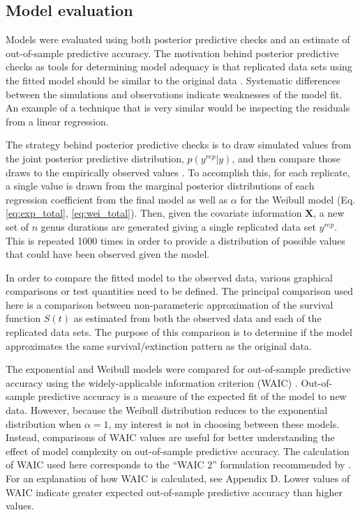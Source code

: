 \documentclass{article}
\begin{document}
\subsection{Model evaluation}

Models were evaluated using both posterior predictive checks and an estimate of out-of-sample predictive accuracy. The motivation behind posterior predictive checks as tools for determining model adequacy is that replicated data sets using the fitted model should be similar to the original data \citep{Gelman2013d}. Systematic differences between the simulations and observations indicate weaknesses of the model fit. An example of a technique that is very similar would be inspecting the residuals from a linear regression.

The strategy behind posterior predictive checks is to draw simulated values from the joint posterior predictive distribution, \(p(y^{rep} | y)\), and then compare those draws to the empirically observed values \citep{Gelman2013d}. To accomplish this, for each replicate, a single value is drawn from the marginal posterior distributions of each regression coefficient from the final model as well as \(\alpha\) for the Weibull model (Eq. \ref{eq:exp_total}, \ref{eq:wei_total}). Then, given the covariate information \(\mathbf{X}\), a new set of \(n\) genus durations are generated giving a single replicated data set \(y^{rep}\). This is repeated 1000 times in order to provide a distribution of possible values that could have been observed given the model. 

In order to compare the fitted model to the observed data, various graphical comparisons or test quantities need to be defined. The principal comparison used here is a comparison between non-parameteric approximation of the survival function \(S(t)\) as estimated from both the observed data and each of the replicated data sets. The purpose of this comparison is to determine if the model approximates the same survival/extinction pattern as the original data. 

The exponential and Weibull models were compared for out-of-sample predictive accuracy using the widely-applicable information criterion (WAIC) \citep{Watanabe2010a}. Out-of-sample predictive accuracy is a measure of the expected fit of the model to new data. However, because the Weibull distribution reduces to the exponential distribution when \(\alpha = 1\), my interest is not in choosing between these models. Instead, comparisons of WAIC values are useful for better understanding the effect of model complexity on out-of-sample predictive accuracy. The calculation of WAIC used here corresponds to the ``WAIC 2'' formulation recommended by \citet{Gelman2013d}. For an explanation of how WAIC is calculated, see Appendix D. Lower values of WAIC indicate greater expected out-of-sample predictive accuracy than higher values.
\end{document}
